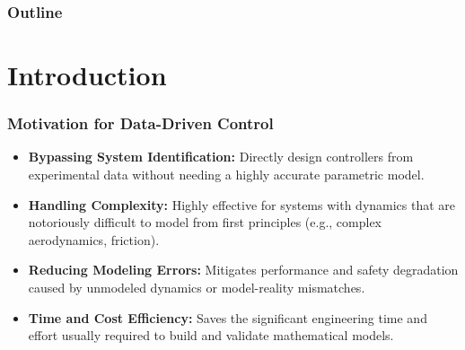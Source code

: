 \documentclass[8pt, hyperref={bookmarks=false},aspectratio=169, xcolor=table]{beamer}
\begin{document}




\hypersetup{
  colorlinks=on,
  linkcolor=black,     %
  urlcolor=black       %
}

\begin{frame}\frametitle{Outline}
  \tableofcontents
\end{frame}

\section{Introduction}
\begin{frame}\frametitle{Motivation for Data-Driven Control}
  \begin{itemize}
    \item \textbf{Bypassing System Identification:} Directly design controllers from experimental data without needing a highly accurate parametric model.
    \item \textbf{Handling Complexity:} Highly effective for systems with dynamics that are notoriously difficult to model from first principles (e.g., complex aerodynamics, friction).
    \item \textbf{Reducing Modeling Errors:} Mitigates performance and safety degradation caused by unmodeled dynamics or model-reality mismatches.
    \item \textbf{Time and Cost Efficiency:} Saves the significant engineering time and effort usually required to build and validate mathematical models.
  \end{itemize}
\end{frame}
\end{document}
